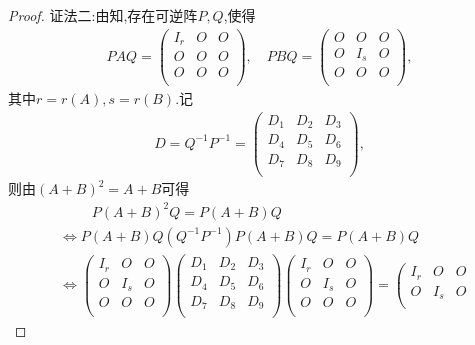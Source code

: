 \documentclass[../../main.tex]{subfiles}%
\begin{document}
\begin{proof}
{\color{blue}证法二:}由知,存在可逆阵$P,Q$,使得
\begin{align*}
PAQ=\left( \begin{matrix}
I_r&		O&		O\\
O&		O&		O\\
O&		O&		O\\
\end{matrix} \right) ,\quad PBQ=\left( \begin{matrix}
O&		O&		O\\
O&		I_s&		O\\
O&		O&		O\\
\end{matrix} \right) ,
\end{align*}
其中$r=r(A),s=r(B).$记
\begin{align*}
D=Q^{-1}P^{-1}=\begin{pmatrix}
D_1&	D_2&	D_3\\
D_4&	D_5&	D_6\\
D_7&	D_8&	D_9\\
\end{pmatrix},
\end{align*}
则由$(A+B)^2=A+B$可得
\begin{align*}
&\qquad \,\, P\left( A+B \right) ^2Q=P\left( A+B \right) Q
\\
&\Longleftrightarrow P\left( A+B \right) Q\left( Q^{-1}P^{-1} \right) P\left( A+B \right) Q=P\left( A+B \right) Q
\\
&\Longleftrightarrow \left( \begin{matrix}
I_r&		O&		O\\
O&		I_s&		O\\
O&		O&		O\\
\end{matrix} \right) \left( \begin{matrix}
D_1&		D_2&		D_3\\
D_4&		D_5&		D_6\\
D_7&		D_8&		D_9\\
\end{matrix} \right) \left( \begin{matrix}
I_r&		O&		O\\
O&		I_s&		O\\
O&		O&		O\\
\end{matrix} \right) =\left( \begin{matrix}
I_r&		O&		O\\
O&		I_s&		O\\

\end{matrix}
\end{align*}
\end{proof}
\end{document}
